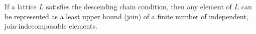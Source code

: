 If a lattice $L$ satisfies the descending chain condition, then any element of $L$ can be represented as a least upper bound (join) of a finite number of independent, join-indecomposable elements.
